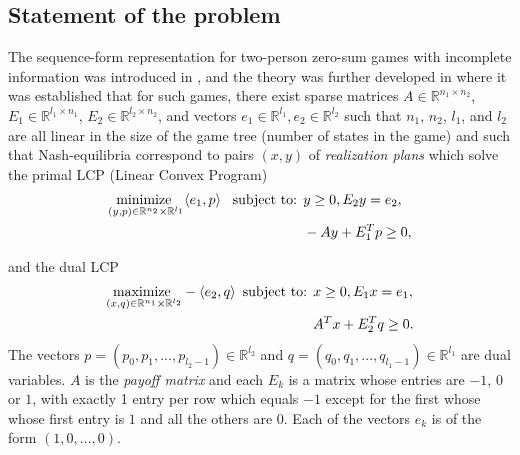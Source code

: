 \documentclass[a4paper,9pt]{extarticle}
\begin{document}
\subsection{Statement of the problem}
The sequence-form representation for two-person zero-sum games with
incomplete information was introduced in
\cite{koller1992complexity}, and the theory was further developed in
\cite{koller1994fast,von1996efficient,vonequilibrium} where it was
established that for such games, there exist sparse matrices
$A \in \mathbb{R}^{n_1 \times n_2}$, $E_1 \in \mathbb{R}^{l_1 \times
  n_1}$, $E_2 \in \mathbb{R}^{l_2 \times n_2}$, and vectors $e_1 \in
\mathbb{R}^{l_1}, e_2 \in \mathbb{R}^{l_2}$ such that $n_1$, $n_2$,
$l_1$, and $l_2$ are all linear in the size of the game tree (number
of states in the game) and such that Nash-equilibria correspond to
pairs $(x, y)$ of \textit{realization plans} which solve the primal
LCP (Linear Convex Program)
\begin{equation}
  \begin{aligned}
    \underset{(y,p) \in \mathbb{R}^{n_2} \times
     \mathbb{R}^{l_1}}{\text{minimize }}\langle e_1,
    p\rangle \hspace{.5em}\text{
       subject to: } &y \ge 0, E_2y = e_2,\\
    &-Ay + E_1^Tp \geq 0,
  \end{aligned}
  \label{eq:primal_pb}
\end{equation}

and the dual LCP
\begin{equation}
  \begin{aligned}
    \underset{(x,q) \in \mathbb{R}^{n_1} \times
      \mathbb{R}^{l_2}}{\text{maximize }}-\langle e_2,
    q\rangle\hspace{.5em}\text{subject
      to: } &x \ge
    0, E_1x = e_1,\\
    &A^Tx + E_2^Tq \geq 0.
  \end{aligned}
  \label{eq:dual_pb}
\end{equation}
The vectors $p = (p_0, p_1, ..., p_{l_2 - 1}) \in \mathbb{R}^{l_2}$
and $q = (q_0, q_1, ..., q_{l_1 - 1}) \in \mathbb{R}^{l_1}$ are dual
variables. 
$A$ is the \textit{payoff matrix} and each $E_k$ is a matrix whose
entries are $-1$, $0$ or $1$, with exactly 1 entry per row which
equals $-1$ except for the first whose whose first entry is $1$ and all
the others are $0$. Each of the vectors $e_k$ is of the form $(1, 0, ..., 0)$.
\end{document}
